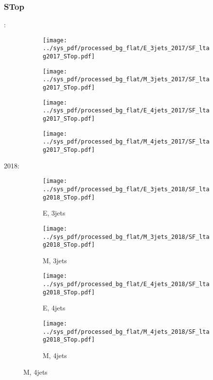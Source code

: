 \documentclass{beamer}
\begin{document}
\begin{frame}
\frametitle{STop}
\fontsize{5}{1}:
\begin{figure}
\centering
\begin{subfigure}[b]{0.24\textwidth}
\texttt{[image: ../sys\_pdf/processed\_bg\_flat/E\_3jets\_2017/SF\_ltag2017\_STop.pdf]}
\end{subfigure}
\begin{subfigure}[b]{0.24\textwidth}
\texttt{[image: ../sys\_pdf/processed\_bg\_flat/M\_3jets\_2017/SF\_ltag2017\_STop.pdf]}
\end{subfigure}
\begin{subfigure}[b]{0.24\textwidth}
\texttt{[image: ../sys\_pdf/processed\_bg\_flat/E\_4jets\_2017/SF\_ltag2017\_STop.pdf]}
\end{subfigure}
\begin{subfigure}[b]{0.24\textwidth}
\texttt{[image: ../sys\_pdf/processed\_bg\_flat/M\_4jets\_2017/SF\_ltag2017\_STop.pdf]}
\end{subfigure}
\end{figure}
2018:
\begin{figure}
\centering
\begin{subfigure}[b]{0.24\textwidth}
\texttt{[image: ../sys\_pdf/processed\_bg\_flat/E\_3jets\_2018/SF\_ltag2018\_STop.pdf]}
\captionsetup{font=tiny}
\caption{E, 3jets}
\end{subfigure}
\begin{subfigure}[b]{0.24\textwidth}
\texttt{[image: ../sys\_pdf/processed\_bg\_flat/M\_3jets\_2018/SF\_ltag2018\_STop.pdf]}
\captionsetup{font=tiny}
\caption{M, 3jets}
\end{subfigure}
\begin{subfigure}[b]{0.24\textwidth}
\texttt{[image: ../sys\_pdf/processed\_bg\_flat/E\_4jets\_2018/SF\_ltag2018\_STop.pdf]}
\captionsetup{font=tiny}
\caption{E, 4jets}
\end{subfigure}
\begin{subfigure}[b]{0.24\textwidth}
\texttt{[image: ../sys\_pdf/processed\_bg\_flat/M\_4jets\_2018/SF\_ltag2018\_STop.pdf]}
\captionsetup{font=tiny}
\caption{M, 4jets}
\end{subfigure}
\end{figure}
\end{frame}
\end{document}
